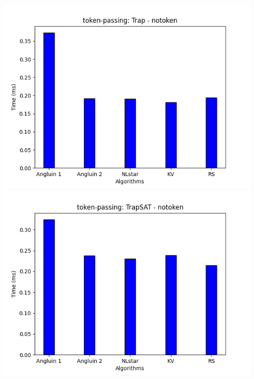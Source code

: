 \includegraphics[scale=0.5]{figures/Trap_notoken.png}
\includegraphics[scale=0.5]{figures/TrapSAT_notoken.png}

